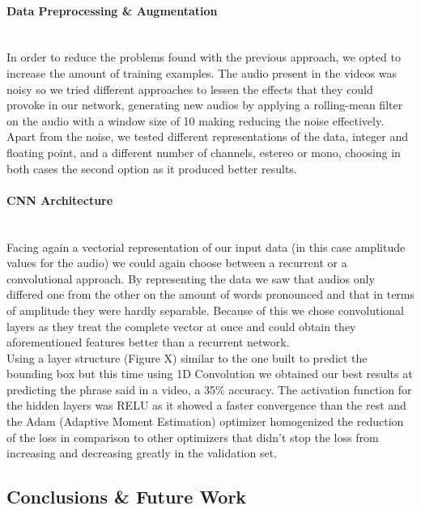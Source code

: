 \documentclass{article}[10pt]
\begin{document}
\begin{multicols}{2}
\paragraph{Data Preprocessing \& Augmentation} ~\\

In order to reduce the problems found with the previous approach, we opted to
increase the amount of training examples. The audio present in the videos was
noisy so we tried different approaches to lessen the effects that they could
provoke in our network, generating new audios by applying a rolling-mean filter
on the audio with a window size of 10 making reducing the noise effectively.\\

Apart from the noise, we tested different representations of the data, integer
and floating point, and a different number of channels, estereo or mono, choosing
in both cases the second option as it produced better results.

\paragraph{CNN Architecture} ~\\

Facing again a vectorial representation of our input data (in this case
amplitude values for the audio) we could again choose between a recurrent or a
convolutional approach. By representing the data we saw that audios only
differed one from the other on the amount of words pronounced and that in terms
of amplitude they were hardly separable. Because of this we chose convolutional
layers as they treat the complete vector at once and could obtain they
aforementioned features better than a recurrent network. \\

Using a layer structure (Figure X) similar to the one built to predict the
bounding box but this time using 1D Convolution we obtained our best results at
predicting the phrase said in a video, a 35\% accuracy. The activation function
for the hidden layers was RELU as it showed a faster convergence than the rest
and the Adam (Adaptive Moment Estimation) optimizer homogenized the reduction of
the loss in comparison to other optimizers that didn't stop the loss from
increasing and decreasing greatly in the validation set.


\subsection{Conclusions \& Future Work}
\end{multicols}
\end{document}
